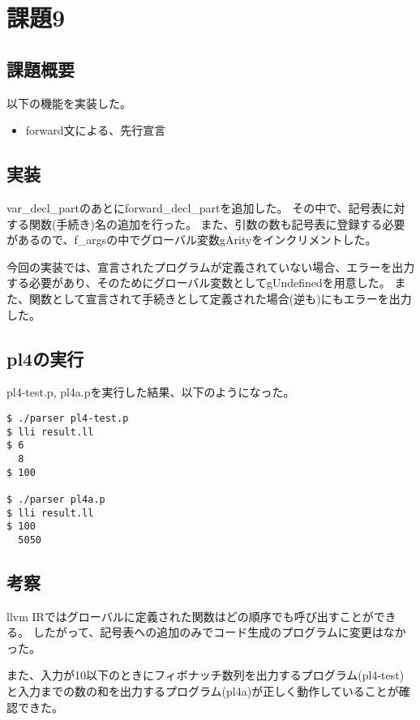 \section{課題9}
\subsection{課題概要}
以下の機能を実装した。
\begin{itemize}
  \item forward文による、先行宣言
\end{itemize}

\subsection{実装}
var\_decl\_partのあとにforward\_decl\_partを追加した。
その中で、記号表に対する関数(手続き)名の追加を行った。
また、引数の数も記号表に登録する必要があるので、f\_argsの中でグローバル変数gArityをインクリメントした。

今回の実装では、宣言されたプログラムが定義されていない場合、エラーを出力する必要があり、そのためにグローバル変数としてgUndefinedを用意した。
また、関数として宣言されて手続きとして定義された場合(逆も)にもエラーを出力した。

\subsection{pl4の実行}
pl4-test.p, pl4a.pを実行した結果、以下のようになった。
\begin{lstlisting}[caption={pl4の実行結果},label={pl4の実行結果}]
$ ./parser pl4-test.p
$ lli result.ll
$ 6
  8
$ 100

$ ./parser pl4a.p
$ lli result.ll
$ 100
  5050
\end{lstlisting}

\subsection{考察}
llvm IRではグローバルに定義された関数はどの順序でも呼び出すことができる。
したがって、記号表への追加のみでコード生成のプログラムに変更はなかった。

また、入力が10以下のときにフィボナッチ数列を出力するプログラム(pl4-test)と入力までの数の和を出力するプログラム(pl4a)が正しく動作していることが確認できた。
